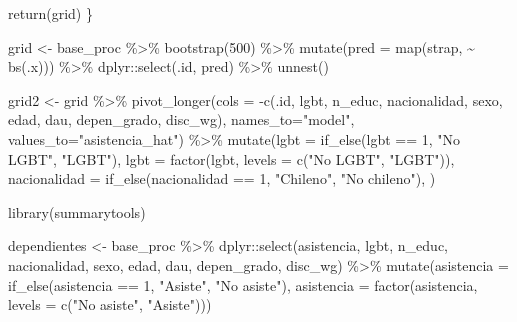 \documentclass[
  12pt,
  a4paper,
]{article}
\newenvironment{Shaded}{\begin{snugshade}}{\end{snugshade}}
\newcommand{\AttributeTok}[1]{\textcolor[rgb]{0.77,0.63,0.00}{#1}}
\newcommand{\DecValTok}[1]{\textcolor[rgb]{0.00,0.00,0.81}{#1}}
\newcommand{\FunctionTok}[1]{\textcolor[rgb]{0.00,0.00,0.00}{#1}}
\newcommand{\NormalTok}[1]{#1}
\newcommand{\OtherTok}[1]{\textcolor[rgb]{0.56,0.35,0.01}{#1}}
\newcommand{\SpecialCharTok}[1]{\textcolor[rgb]{0.00,0.00,0.00}{#1}}
\newcommand{\StringTok}[1]{\textcolor[rgb]{0.31,0.60,0.02}{#1}}
\begin{document}
\begin{Shaded}
\begin{Highlighting}[]
  \FunctionTok{return}\NormalTok{(grid)}
\NormalTok{\}}

\NormalTok{grid }\OtherTok{\textless{}{-}}\NormalTok{ base\_proc }\SpecialCharTok{\%\textgreater{}\%} 
  \FunctionTok{bootstrap}\NormalTok{(}\DecValTok{500}\NormalTok{) }\SpecialCharTok{\%\textgreater{}\%} 
  \FunctionTok{mutate}\NormalTok{(}\AttributeTok{pred =} \FunctionTok{map}\NormalTok{(strap, }\SpecialCharTok{\textasciitilde{}} \FunctionTok{bs}\NormalTok{(.x))) }\SpecialCharTok{\%\textgreater{}\%} 
\NormalTok{  dplyr}\SpecialCharTok{::}\FunctionTok{select}\NormalTok{(.id, pred) }\SpecialCharTok{\%\textgreater{}\%} 
  \FunctionTok{unnest}\NormalTok{()}


\NormalTok{grid2 }\OtherTok{\textless{}{-}}\NormalTok{ grid }\SpecialCharTok{\%\textgreater{}\%} 
  \FunctionTok{pivot\_longer}\NormalTok{(}\AttributeTok{cols =} \SpecialCharTok{{-}}\FunctionTok{c}\NormalTok{(.id, lgbt, n\_educ, nacionalidad, sexo, }
\NormalTok{                         edad, dau, depen\_grado, disc\_wg), }
               \AttributeTok{names\_to=}\StringTok{"model"}\NormalTok{,}
               \AttributeTok{values\_to=}\StringTok{"asistencia\_hat"}\NormalTok{) }\SpecialCharTok{\%\textgreater{}\%}
  \FunctionTok{mutate}\NormalTok{(}\AttributeTok{lgbt =} \FunctionTok{if\_else}\NormalTok{(lgbt }\SpecialCharTok{==} \DecValTok{1}\NormalTok{, }\StringTok{"No LGBT"}\NormalTok{, }\StringTok{"LGBT"}\NormalTok{),}
         \AttributeTok{lgbt =} \FunctionTok{factor}\NormalTok{(lgbt, }\AttributeTok{levels =} \FunctionTok{c}\NormalTok{(}\StringTok{"No LGBT"}\NormalTok{, }\StringTok{"LGBT"}\NormalTok{)),}
         \AttributeTok{nacionalidad =} \FunctionTok{if\_else}\NormalTok{(nacionalidad }\SpecialCharTok{==} \DecValTok{1}\NormalTok{, }\StringTok{"Chileno"}\NormalTok{, }\StringTok{"No chileno"}\NormalTok{),}
\NormalTok{  ) }


\FunctionTok{library}\NormalTok{(summarytools)}

\NormalTok{dependientes }\OtherTok{\textless{}{-}}\NormalTok{ base\_proc }\SpecialCharTok{\%\textgreater{}\%} 
\NormalTok{  dplyr}\SpecialCharTok{::}\FunctionTok{select}\NormalTok{(asistencia, lgbt, n\_educ, nacionalidad, sexo, edad, dau, depen\_grado, disc\_wg) }\SpecialCharTok{\%\textgreater{}\%} 
  \FunctionTok{mutate}\NormalTok{(}\AttributeTok{asistencia =} \FunctionTok{if\_else}\NormalTok{(asistencia }\SpecialCharTok{==} \DecValTok{1}\NormalTok{, }\StringTok{"Asiste"}\NormalTok{, }\StringTok{"No asiste"}\NormalTok{),}
         \AttributeTok{asistencia =} \FunctionTok{factor}\NormalTok{(asistencia, }\AttributeTok{levels =} \FunctionTok{c}\NormalTok{(}\StringTok{"No asiste"}\NormalTok{, }\StringTok{"Asiste"}\NormalTok{)))}



\end{Highlighting}
\end{Shaded}
\end{document}
